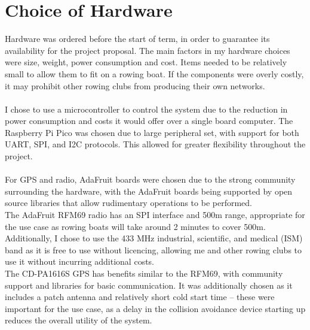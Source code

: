 \documentclass[12pt,a4paper]{report}
\begin{document}
\section{Choice of Hardware} 
Hardware was ordered before the start of term, in order to guarantee its availability for the project proposal. The main factors in my hardware choices were size, weight, power consumption and cost. Items needed to be relatively small to allow them to fit on a rowing boat. If the components were overly costly, it may prohibit other rowing clubs from producing their own networks. \\ \\
I chose to use a microcontroller to control the system due to the reduction in power consumption and costs it would offer over a single board computer. The Raspberry Pi Pico was chosen due to large peripheral set, with support for both UART, SPI, and I2C protocols. This allowed for greater flexibility throughout the project. \\ \\ %
For GPS and radio, AdaFruit boards were chosen due to the strong community surrounding the hardware, with the AdaFruit boards being supported by open source libraries that allow rudimentary operations to be performed. \\
The AdaFruit RFM69 radio has an SPI interface and 500m range, appropriate for the use case as rowing boats will take around 2 minutes to cover 500m. Additionally, I chose to use the 433 MHz industrial, scientific, and medical (ISM) band as it is free to use without licencing, allowing me and other rowing clubs to use it without incurring additional costs. \\
The CD-PA1616S GPS has benefits similar to the RFM69, with community support and libraries for basic communication. It was additionally chosen as it includes a patch antenna and relatively short cold start time -- these were important for the use case, as a delay in the collision avoidance device starting up reduces the overall utility of the system.
\end{document}
